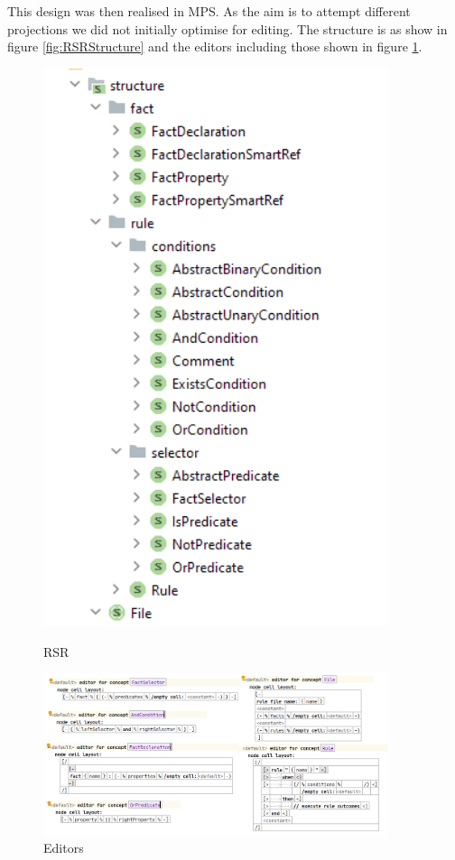 This design was then realised in MPS.
As the aim is to attempt different projections we did not initially optimise for editing.
The structure is as show in figure \ref{fig:RSRStructure} and the editors including those shown in figure \ref{fig:RSREditors}.

\begin{figure}
    \centering
    \begin{minipage}{0.30\textwidth}
        \centering
        \includegraphics[width=0.9\textwidth]{Sections/images/RSRStructrure.png}
        \caption{RSR}
        \label{fig:RSRStructure}
    \end{minipage}\hfill
    \begin{minipage}{0.70\textwidth}
        \centering
        \includegraphics[width=0.9\textwidth]{Sections/images/RSREditors.png} 
        \caption{Editors}
        \label{fig:RSREditors}
    \end{minipage}
\end{figure}

